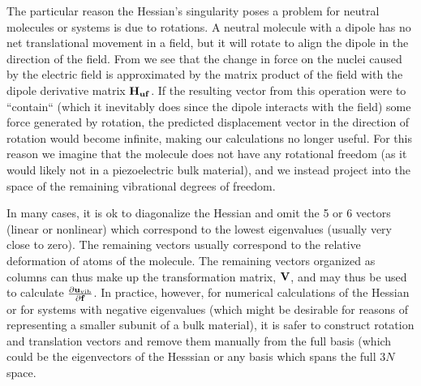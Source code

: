 The particular reason the Hessian's singularity poses a problem for neutral molecules or systems is due to rotations.  
A neutral molecule with a dipole has no net translational movement 
in a field, but it will rotate to align the dipole in the direction of the field.  
From  we see that the change in force on the nuclei caused by the electric field is approximated by the matrix product of the field with the dipole derivative matrix ${\bf{H_{uf}}}$. 
If the resulting vector from this operation were to ``contain`` (which it inevitably does since the dipole interacts with the field) some force generated by rotation, the predicted
displacement vector in the direction of rotation would become infinite, making our calculations no longer useful.  
For this reason we imagine that the molecule does not have any rotational
freedom (as it would likely not in a piezoelectric bulk material), and we instead project  into the space of the remaining vibrational degrees of freedom.  

In many cases, it is ok to diagonalize the Hessian and omit the 5 or 6 vectors (linear or nonlinear) which correspond to the lowest eigenvalues (usually very close to zero).
The remaining vectors usually correspond to the relative deformation of atoms of the molecule.  
The remaining vectors organized as columns can thus make up the transformation matrix, ${\bf{V}}$, and  may thus be used to calculate ${\frac{\partial {\ensuremath{\bf{u}}}_{\mathrm{vib}}}{\partial {\ensuremath{\bf{f}}}}}$.
In practice, however, for numerical calculations of the Hessian or for systems with negative eigenvalues (which might be desirable for reasons of representing a smaller subunit
of a bulk material), it is safer to construct rotation and translation vectors and remove them manually from the full basis (which could be the eigenvectors of the Hesssian or any basis
which spans the full $3N$ space. 

